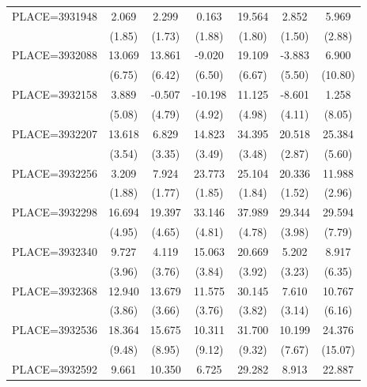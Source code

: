 {\begin{tabular}{l*{6}{c}}
PLACE=3931948       &       2.069&       2.299&       0.163&      19.564&       2.852&       5.969\\
                    &      (1.85)&      (1.73)&      (1.88)&      (1.80)&      (1.50)&      (2.88)\\
PLACE=3932088       &      13.069&      13.861&      -9.020&      19.109&      -3.883&       6.900\\
                    &      (6.75)&      (6.42)&      (6.50)&      (6.67)&      (5.50)&     (10.80)\\
PLACE=3932158       &       3.889&      -0.507&     -10.198&      11.125&      -8.601&       1.258\\
                    &      (5.08)&      (4.79)&      (4.92)&      (4.98)&      (4.11)&      (8.05)\\
PLACE=3932207       &      13.618&       6.829&      14.823&      34.395&      20.518&      25.384\\
                    &      (3.54)&      (3.35)&      (3.49)&      (3.48)&      (2.87)&      (5.60)\\
PLACE=3932256       &       3.209&       7.924&      23.773&      25.104&      20.336&      11.988\\
                    &      (1.88)&      (1.77)&      (1.85)&      (1.84)&      (1.52)&      (2.96)\\
PLACE=3932298       &      16.694&      19.397&      33.146&      37.989&      29.344&      29.594\\
                    &      (4.95)&      (4.65)&      (4.81)&      (4.78)&      (3.98)&      (7.79)\\
PLACE=3932340       &       9.727&       4.119&      15.063&      20.669&       5.202&       8.917\\
                    &      (3.96)&      (3.76)&      (3.84)&      (3.92)&      (3.23)&      (6.35)\\
PLACE=3932368       &      12.940&      13.679&      11.575&      30.145&       7.610&      10.767\\
                    &      (3.86)&      (3.66)&      (3.76)&      (3.82)&      (3.14)&      (6.16)\\
PLACE=3932536       &      18.364&      15.675&      10.311&      31.700&      10.199&      24.376\\
                    &      (9.48)&      (8.95)&      (9.12)&      (9.32)&      (7.67)&     (15.07)\\
PLACE=3932592       &       9.661&      10.350&       6.725&      29.282&       8.913&      22.887\\

\end{tabular}}
